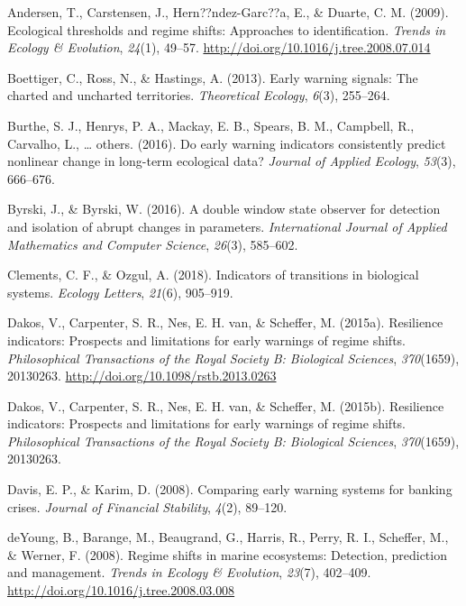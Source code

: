 \documentclass[12pt,twoside,openany]{reedthesis}
\begin{document}
\hypertarget{refs}{}
\hypertarget{ref-andersen_ecological_2009}{}
Andersen, T., Carstensen, J., Hern??ndez-Garc??a, E., \& Duarte, C. M.
(2009). Ecological thresholds and regime shifts: Approaches to
identification. \emph{Trends in Ecology \& Evolution}, \emph{24}(1),
49--57. \url{http://doi.org/10.1016/j.tree.2008.07.014}

\hypertarget{ref-boettiger_early_2013}{}
Boettiger, C., Ross, N., \& Hastings, A. (2013). Early warning signals:
The charted and uncharted territories. \emph{Theoretical Ecology},
\emph{6}(3), 255--264.

\hypertarget{ref-burthe2016early}{}
Burthe, S. J., Henrys, P. A., Mackay, E. B., Spears, B. M., Campbell,
R., Carvalho, L., \ldots{} others. (2016). Do early warning indicators
consistently predict nonlinear change in long-term ecological data?
\emph{Journal of Applied Ecology}, \emph{53}(3), 666--676.

\hypertarget{ref-byrski2016double}{}
Byrski, J., \& Byrski, W. (2016). A double window state observer for
detection and isolation of abrupt changes in parameters.
\emph{International Journal of Applied Mathematics and Computer
Science}, \emph{26}(3), 585--602.

\hypertarget{ref-clements2018indicators}{}
Clements, C. F., \& Ozgul, A. (2018). Indicators of transitions in
biological systems. \emph{Ecology Letters}, \emph{21}(6), 905--919.

\hypertarget{ref-dakos_resilience_2015}{}
Dakos, V., Carpenter, S. R., Nes, E. H. van, \& Scheffer, M. (2015a).
Resilience indicators: Prospects and limitations for early warnings of
regime shifts. \emph{Philosophical Transactions of the Royal Society B:
Biological Sciences}, \emph{370}(1659), 20130263.
\url{http://doi.org/10.1098/rstb.2013.0263}

\hypertarget{ref-dakos2015resilience}{}
Dakos, V., Carpenter, S. R., Nes, E. H. van, \& Scheffer, M. (2015b).
Resilience indicators: Prospects and limitations for early warnings of
regime shifts. \emph{Philosophical Transactions of the Royal Society B:
Biological Sciences}, \emph{370}(1659), 20130263.

\hypertarget{ref-davis_comparing_2008}{}
Davis, E. P., \& Karim, D. (2008). Comparing early warning systems for
banking crises. \emph{Journal of Financial Stability}, \emph{4}(2),
89--120.

\hypertarget{ref-deyoung_regime_2008}{}
deYoung, B., Barange, M., Beaugrand, G., Harris, R., Perry, R. I.,
Scheffer, M., \& Werner, F. (2008). Regime shifts in marine ecosystems:
Detection, prediction and management. \emph{Trends in Ecology \&
Evolution}, \emph{23}(7), 402--409.
\url{http://doi.org/10.1016/j.tree.2008.03.008}
\end{document}
